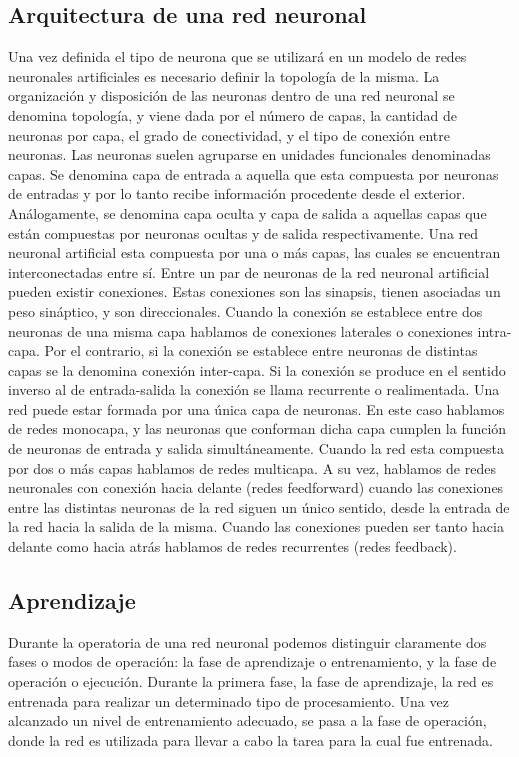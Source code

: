 \subsection{Arquitectura de una red neuronal}
Una vez definida el tipo de neurona que se utilizar\'a en un modelo de redes
neuronales artificiales es necesario definir la topolog\'ia de la misma.
La organizaci\'on y disposici\'on de las neuronas dentro de una red neuronal
se denomina topolog\'ia, y viene dada por el n\'umero de capas, la cantidad de
neuronas por capa, el grado de conectividad, y el tipo de conexi\'on entre
neuronas.
Las neuronas suelen agruparse en unidades funcionales denominadas
capas. Se denomina capa de entrada a aquella que esta compuesta por
neuronas de entradas y por lo tanto recibe informaci\'on procedente desde el
exterior. An\'alogamente, se denomina capa oculta y capa de salida a aquellas
capas que est\'an compuestas por neuronas ocultas y de salida
respectivamente. Una red neuronal artificial esta compuesta por una o m\'as
capas, las cuales se encuentran interconectadas entre s\'i.
Entre un par de neuronas de la red neuronal artificial pueden existir
conexiones. Estas conexiones son las sinapsis, tienen asociadas un peso
sin\'aptico, y son direccionales.
Cuando la conexi\'on se establece entre dos neuronas de una misma capa
hablamos de conexiones laterales o conexiones intra-capa. Por el contrario, si
la conexi\'on se establece entre neuronas de distintas capas se la denomina
conexi\'on inter-capa. Si la conexi\'on se produce en el sentido inverso al de
entrada-salida la conexi\'on se llama recurrente o realimentada.
Una red puede estar formada por una \'unica capa de neuronas. En este
caso hablamos de redes monocapa, y las neuronas que conforman dicha capa
cumplen la funci\'on de neuronas de entrada y salida simult\'aneamente. Cuando
la red esta compuesta por dos o m\'as capas hablamos de redes multicapa.
A su vez, hablamos de redes neuronales con conexi\'on hacia delante (redes
feedforward) cuando las conexiones entre las distintas neuronas de la red
siguen un \'unico sentido, desde la entrada de la red hacia la salida de la misma.
Cuando las conexiones pueden ser tanto hacia delante como hacia atr\'as
hablamos de redes recurrentes (redes feedback).

\subsection{Aprendizaje}
Durante la operatoria de una red neuronal podemos distinguir claramente
dos fases o modos de operaci\'on: la fase de aprendizaje o entrenamiento, y la
fase de operaci\'on o ejecuci\'on.
Durante la primera fase, la fase de aprendizaje, la red es entrenada para
realizar un determinado tipo de procesamiento. Una vez alcanzado un nivel de
entrenamiento adecuado, se pasa a la fase de operaci\'on, donde la red es
utilizada para llevar a cabo la tarea para la cual fue entrenada.

